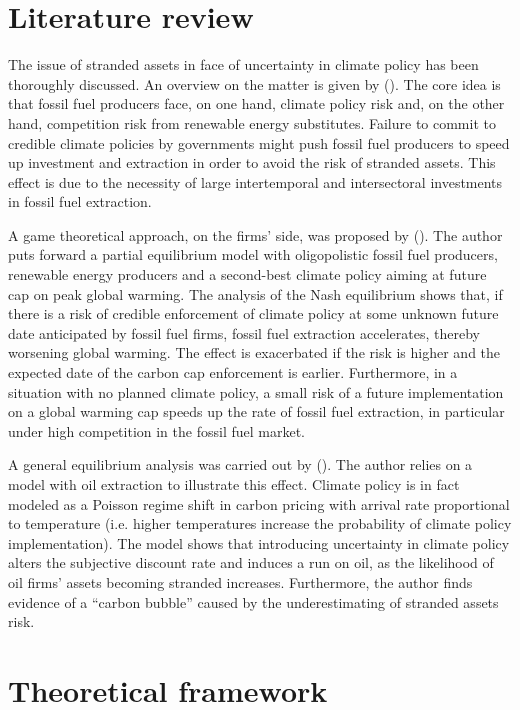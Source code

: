 \documentclass[american]{scrartcl}
\newcommand{\citein}[1]{\citeauthor{#1} (\citeyear{#1})}
\begin{document}
\section{Literature review}

The issue of stranded assets in face of uncertainty in climate policy has been thoroughly discussed. An overview on the matter is given by \citein{Ploeg2020}. The core idea is that fossil fuel producers face, on one hand, climate policy risk and, on the other hand, competition risk from renewable energy substitutes. Failure to commit to credible climate policies by governments might push fossil fuel producers to speed up investment and extraction in order to avoid the risk of stranded assets. This effect is due to the necessity of large intertemporal and intersectoral investments in fossil fuel extraction.

A game theoretical approach, on the firms' side, was proposed by \citein{Ploeg2020b}. The author puts forward a partial equilibrium model with oligopolistic fossil fuel producers, renewable energy producers and a second-best climate policy aiming at future cap on peak global warming. The analysis of the Nash equilibrium shows that, if there is a risk of credible enforcement of climate policy at some unknown future date anticipated by fossil fuel firms, fossil fuel extraction accelerates, thereby worsening global warming. The effect is exacerbated if the risk is higher and the expected date of the carbon cap enforcement is earlier. Furthermore, in a situation with no planned climate policy, a small risk of a future implementation on a global warming cap speeds up the rate of fossil fuel extraction, in particular under high competition in the fossil fuel market.

A general equilibrium analysis was carried out by \citein{Barnett2019}. The author relies on a model with oil extraction to illustrate this effect. Climate policy is in fact modeled as a Poisson regime shift in carbon pricing with arrival rate proportional to temperature (i.e. higher temperatures increase the probability of climate policy implementation). The model shows that introducing uncertainty in climate policy alters the subjective discount rate and induces a run on oil, as the likelihood of oil firms' assets becoming stranded increases. Furthermore, the author finds evidence of a ``carbon bubble'' caused by the underestimating of stranded assets risk.

\section{Theoretical framework}
\end{document}
